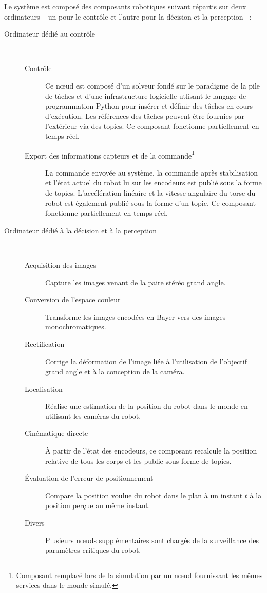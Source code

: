 Le système est composé des composants robotiques suivant répartis sur
deux ordinateurs -- un pour le contrôle et l'autre pour la décision et
la perception --:
\begin{description}
\item[Ordinateur dédié au contrôle]
   \\
  \begin{description}
  \item[Contrôle] Ce n\oe ud est composé d'un solveur fondé sur le
    paradigme de la pile de tâches et d'une infrastructure logicielle
    utlisant le langage de programmation Python pour insérer et
    définir des tâches en cours d'exécution. Les références des tâches
    peuvent être fournies par l'extérieur via des topics. Ce composant
    fonctionne partiellement en temps réel.
  \item[Export des informations capteurs et de la
    commande\footnote{Composant remplacé lors de la simulation par un
      n\oe ud fournissant les mêmes services dans le monde
      simulé.}\addtocounter{footnote}{-1}\addtocounter{Hfootnote}{-1}]
    La commande envoyée au système, la commande après stabilisation et
    l'état actuel du robot lu sur les encodeurs est publié sous la
    forme de topics. L'accélération linéaire et la vitesse angulaire
    du torse du robot est également publié sous la forme d'un
    topic. Ce composant fonctionne partiellement en temps réel.
  \end{description}

\item[Ordinateur dédié à la décision et à la perception]
   \\
  \begin{description}
  \item[Acquisition des images\footnotemark] Capture les images venant de la paire
    stéréo grand angle.
  \item[Conversion de l'espace couleur] Transforme les images encodées
    en Bayer vers des images monochromatiques.
  \item[Rectification] Corrige la déformation de l'image liée à
    l'utilisation de l'objectif grand angle et à la conception de la
    caméra.
  \item[Localisation] Réalise une estimation de la position du robot
    dans le monde en utilisant les caméras du robot.
  \item[Cinématique directe] À partir de l'état des encodeurs, ce
    composant recalcule la position relative de tous les corps et les
    publie sous forme de topics.
  \item[Évaluation de l'erreur de positionnement] Compare la position
    voulue du robot dans le plan à un instant $t$ à la position perçue
    au même instant.
  \item[Divers] Plusieurs n\oe uds supplémentaires sont chargés de la
    surveillance des paramètres critiques du robot.
  \end{description}
\end{description}


